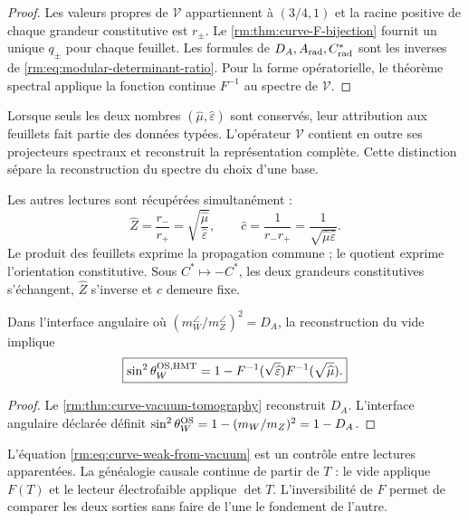 \begin{proof}
Les valeurs propres de \(\mathcal V\) appartiennent à \((3/4,1)\) et la racine positive de chaque grandeur constitutive est \(r_\pm\). Le \cref{rm:thm:curve-F-bijection} fournit un unique \(q_\pm\) pour chaque feuillet. Les formules de \(D_A,A_{\rm rad},C^*_{\rm rad}\) sont les inverses de \cref{rm:eq:modular-determinant-ratio}. Pour la forme opératorielle, le théorème spectral applique la fonction continue \(F^{-1}\) au spectre de \(\mathcal V\).
\end{proof}

Lorsque seuls les deux nombres \((\widehat\mu,\widehat\varepsilon)\) sont conservés, leur attribution aux feuillets fait partie des données typées. L’opérateur \(\mathcal V\) contient en outre ses projecteurs spectraux et reconstruit la représentation complète. Cette distinction sépare la reconstruction du spectre du choix d’une base.

Les autres lectures sont récupérées simultanément :
\begin{equation}
 \widehat Z=\frac{r_-}{r_+}
 =\sqrt{\frac{\widehat\mu}{\widehat\varepsilon}},
 \qquad
 \widehat c=\frac1{r_-r_+}
 =\frac1{\sqrt{\widehat\mu\widehat\varepsilon}}.
 \label{rm:eq:curve-recover-Z-c}
\end{equation}
Le produit des feuillets exprime la propagation commune ; le quotient exprime l’orientation constitutive. Sous \(C^*\mapsto-C^*\), les deux grandeurs constitutives s’échangent, \(\widehat Z\) s’inverse et \(\widehat c\) demeure fixe.

\begin{corollary}
\label{rm:cor:curve-weak-control} Dans l’interface angulaire où \((m_W^{\angle}/m_Z^{\angle})^2=D_A\), la reconstruction du vide implique
\begin{equation}
 \boxed{
 \sin^2\theta_W^{\rm OS,HMT}
 =1-F^{-1}(\sqrt{\widehat\varepsilon})
      F^{-1}(\sqrt{\widehat\mu}).}
 \label{rm:eq:curve-weak-from-vacuum}
\end{equation}
\end{corollary}

\begin{proof}
Le \cref{rm:thm:curve-vacuum-tomography} reconstruit \(D_A\). L’interface angulaire déclarée définit \(\sin^2\theta_W^{\rm OS}=1-(m_W/m_Z)^2=1-D_A\).
\end{proof}

L’équation \cref{rm:eq:curve-weak-from-vacuum} est un contrôle entre lectures apparentées. La généalogie causale continue de partir de \(T\) : le vide applique \(F(T)\) et le lecteur électrofaible applique \(\det T\). L’inversibilité de \(F\) permet de comparer les deux sorties sans faire de l’une le fondement de l’autre.

